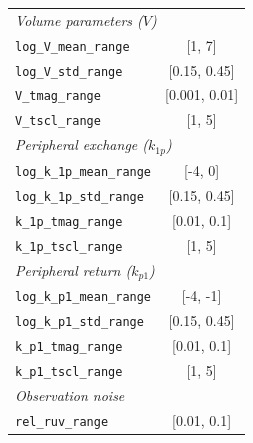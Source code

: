 \begin{table}[h]
\begin{tabular}{lc}
\midrule
\multicolumn{2}{l}{\textit{Volume parameters ($V$)}} \\
\texttt{log\_V\_mean\_range}         & [1, 7] \\
\texttt{log\_V\_std\_range}          & [0.15, 0.45] \\
\texttt{V\_tmag\_range}              & [0.001, 0.01] \\
\texttt{V\_tscl\_range}              & [1, 5] \\

\midrule
\multicolumn{2}{l}{\textit{Peripheral exchange ($k_{1p}$)}} \\
\texttt{log\_k\_1p\_mean\_range}     & [-4, 0] \\
\texttt{log\_k\_1p\_std\_range}      & [0.15, 0.45] \\
\texttt{k\_1p\_tmag\_range}          & [0.01, 0.1] \\
\texttt{k\_1p\_tscl\_range}          & [1, 5] \\

\midrule
\multicolumn{2}{l}{\textit{Peripheral return ($k_{p1}$)}} \\
\texttt{log\_k\_p1\_mean\_range}     & [-4, -1] \\
\texttt{log\_k\_p1\_std\_range}      & [0.15, 0.45] \\
\texttt{k\_p1\_tmag\_range}          & [0.01, 0.1] \\
\texttt{k\_p1\_tscl\_range}          & [1, 5] \\

\midrule
\multicolumn{2}{l}{\textit{Observation noise}} \\
\texttt{rel\_ruv\_range}             & [0.01, 0.1] \\

\bottomrule
\end{tabular}
\end{table}
